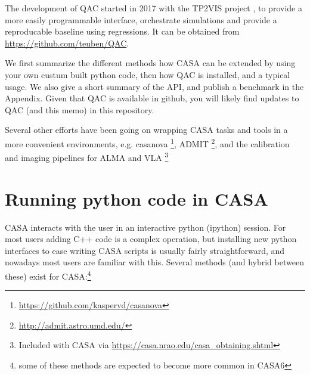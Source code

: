 \documentclass[11pt,twoside]{article}
\begin{document}


The development of QAC started in 2017 with the TP2VIS project \citep{tp2vis}, to provide a
more easily programmable interface, orchestrate simulations and provide a
reproducable baseline using regressions. It can be obtained from \url{https://github.com/teuben/QAC}.

We first summarize the different methods how CASA can be extended by using your own
custum built python code, then how QAC is installed, and a typical usage. We also give a short
summary of the API, and publish a benchmark in the Appendix. Given that QAC is available
in github, you will likely find updates to QAC (and this memo) in this repository.


Several other efforts have been going on wrapping CASA tasks and tools in a more
convenient environments, e.g. casanova
\footnote{\url{https://github.com/kaspervd/casanova}}, ADMIT
\footnote{\url{http://admit.astro.umd.edu/}}, and the calibration and imaging
pipelines for ALMA and VLA
\footnote{Included with CASA via \url{https://casa.nrao.edu/casa_obtaining.shtml}}



\section{Running python code in CASA}

CASA interacts with the user in an interactive python (ipython) session. For most users adding 
C++ code is a complex operation, but installing new python interfaces to ease writing CASA scripts
is usually fairly straightforward, and nowadays most users are familiar with this.
Several methods (and hybrid between these) exist
for CASA:\footnote{some of these methods are expected to become more common in CASA6}
\end{document}
